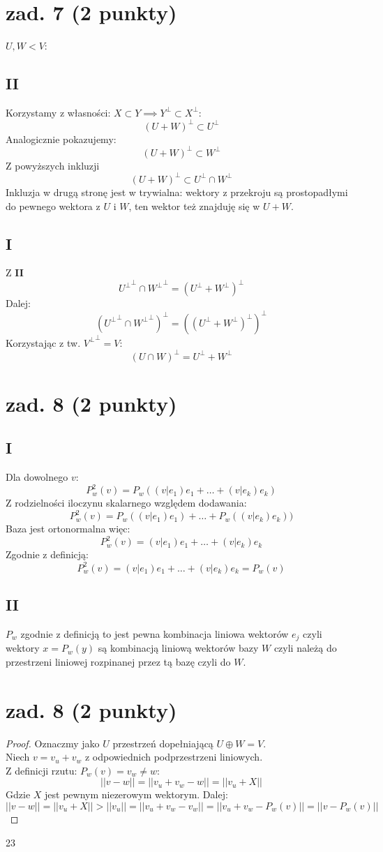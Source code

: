 \documentclass{article}
\begin{document}
\section{\\\\\\\\zad. 7 (2 punkty)}
$U,W < V$:
\subsection*{II}
Korzystamy z własności: $X \subset Y \implies Y^\perp \subset X^\perp$:
$$(U + W)^\perp \subset U^\perp$$
Analogicznie pokazujemy:
$$(U + W)^\perp \subset W^\perp$$
Z powyższych inkluzji
$$
(U + W)^\perp  \subset  U^\perp \cap W^\perp
$$
Inkluzja w drugą stronę jest w trywialna: wektory z przekroju są prostopadłymi do pewnego wektora z $U$ i $W$, ten wektor też znajduję się w $U+W$.
\subsection*{I}
Z \textbf{II}
$$
{U^\perp}^\perp \cap {W^\perp}^\perp = ({U}^\perp + {W}^\perp)^\perp
$$
Dalej:
$$
({U^\perp}^\perp \cap {W^\perp}^\perp)^\perp = (({U}^\perp + {W}^\perp)^\perp)^\perp 
$$
Korzystając z tw. ${V^\perp}^\perp = V$:
$$
(U \cap W)^\perp  =  U^\perp + W^\perp
$$
\section{zad. 8 (2 punkty)}
\subsection*{I}
Dla dowolnego $v$:
$$P_w^2(v) = P_w((v|e_1)e_1 + \dots +(v|e_k)e_k)$$
Z rodzielności iloczynu skalarnego względem dodawania:
$$P_w^2(v) = P_w((v|e_1)e_1) + \dots + P_w((v|e_k)e_k))$$
Baza jest ortonormalna więc:
$$P_w^2(v) = (v|e_1)e_1 + \dots + (v|e_k)e_k$$
Zgodnie z definicją:
$$P_w^2(v) = (v|e_1)e_1 + \dots + (v|e_k)e_k = P_w(v)$$
\subsection*{II}
$P_w$ zgodnie z definicją to jest pewna kombinacja liniowa wektorów $e_j$ czyli wektory $x = P_w(y)$ są kombinacją liniową wektorów bazy $W$ czyli należą do przestrzeni liniowej rozpinanej przez tą bazę czyli do $W$.
\section{zad. 8 (2 punkty)}
\begin{proof}
Oznaczmy jako $U$ przestrzeń dopełniającą $U \oplus W = V$.\\
Niech $v = v_u + v_w$ z odpowiednich podprzestrzeni liniowych.\\
Z definicji rzutu: $P_w(v) = v_w \neq w$:
$$
||v-w|| = ||v_u + v_w - w|| = ||v_u + X||
$$
Gdzie $X$ jest pewnym niezerowym wektorym. Dalej:
$$
||v-w|| = ||v_u + X|| > ||v_u|| = ||v_u + v_w - v_w|| = ||v_u + v_w - P_w(v)|| = ||v - P_w(v)||
$$
\end{proof}
23
\end{document}
